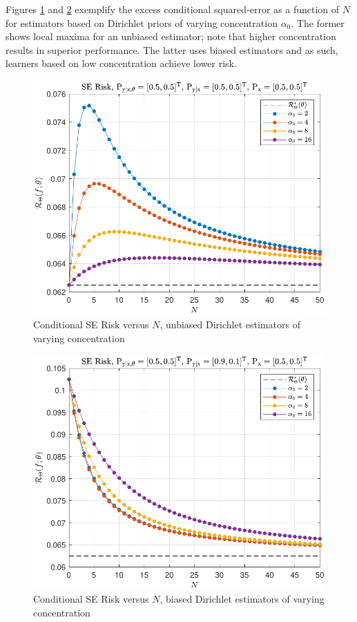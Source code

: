 \documentclass[12pt]{report}
\begin{document}
Figures \ref{fig:Risk_cond_SE_Dir_N_leg_a0_unbiased} and \ref{fig:Risk_cond_SE_Dir_N_leg_a0_biased} exemplify the excess conditional squared-error as a function of $N$ for estimators based on Dirichlet priors of varying concentration $\alpha_0$. The former shows local maxima for an unbiased estimator; note that higher concentration results in superior performance. The latter uses biased estimators and as such, learners based on low concentration achieve lower risk.
\begin{figure}
\centering
\includegraphics[width=0.7\linewidth]{Risk_cond_SE_Dir_N_leg_a0_unbiased.pdf}
\caption{Conditional SE Risk versus $N$, unbiased Dirichlet estimators of varying concentration}
\label{fig:Risk_cond_SE_Dir_N_leg_a0_unbiased}
\end{figure}
\begin{figure}
\centering
\includegraphics[width=0.7\linewidth]{Risk_cond_SE_Dir_N_leg_a0_biased.pdf}
\caption{Conditional SE Risk versus $N$, biased Dirichlet estimators of varying concentration}
\label{fig:Risk_cond_SE_Dir_N_leg_a0_biased}
\end{figure}
\end{document}
